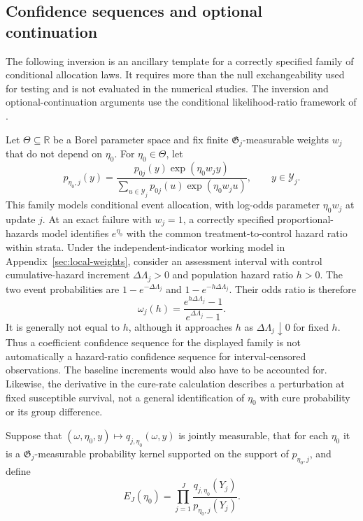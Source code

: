 \documentclass[12pt]{article}
\theoremstyle{definition}
\theoremstyle{remark}
\begin{document}
\subsection{Confidence sequences and optional continuation}
The following inversion is an ancillary template for a correctly specified family of conditional allocation laws. It requires more than the null exchangeability used for testing and is not evaluated in the numerical studies.
The inversion and optional-continuation arguments use the conditional likelihood-ratio framework of \citet{TerSchureEtAl2024}.
\label{app:confidence-sequences}

Let $\Theta\subseteq\mathbb R$ be a Borel parameter space and fix finite $\mathfrak G_j$-measurable weights $w_j$ that do not depend on $\eta_0$. For $\eta_0\in\Theta$, let
\[
 p_{\eta_0,j}(y)=
 \frac{p_{0j}(y)\exp(\eta_0w_jy)}
 {\sum_{u\in\mathcal Y_j}p_{0j}(u)\exp(\eta_0w_ju)},
 \qquad y\in\mathcal Y_j.
\]
This family models conditional event allocation, with log-odds parameter $\eta_0w_j$ at update $j$. At an exact failure with $w_j=1$, a correctly specified proportional-hazards model identifies $e^{\eta_0}$ with the common treatment-to-control hazard ratio within strata. Under the independent-indicator working model in Appendix~\ref{sec:local-weights}, consider an assessment interval with control cumulative-hazard increment $\Delta\Lambda_j>0$ and population hazard ratio $h>0$. The two event probabilities are $1-e^{-\Delta\Lambda_j}$ and $1-e^{-h\Delta\Lambda_j}$. Their odds ratio is therefore
\begin{equation}
 \omega_j(h)=\frac{e^{h\Delta\Lambda_j}-1}
                  {e^{\Delta\Lambda_j}-1}.
 \label{eq:interval-hr-odds}
\end{equation}
It is generally not equal to $h$, although it approaches $h$ as $\Delta\Lambda_j\downarrow0$ for fixed $h$. Thus a coefficient confidence sequence for the displayed family is not automatically a hazard-ratio confidence sequence for interval-censored observations. The baseline increments would also have to be accounted for. Likewise, the derivative in the cure-rate calculation describes a perturbation at fixed susceptible survival, not a general identification of $\eta_0$ with cure probability or its group difference.

Suppose that $(\omega,\eta_0,y)\mapsto q_{j,\eta_0}(\omega,y)$ is jointly measurable, that for each $\eta_0$ it is a $\mathfrak G_j$-measurable probability kernel supported on the support of $p_{\eta_0,j}$, and define
\[
 E_J(\eta_0)=\prod_{j=1}^J
 \frac{q_{j,\eta_0}(Y_j)}{p_{\eta_0,j}(Y_j)}.
\]
\end{document}
